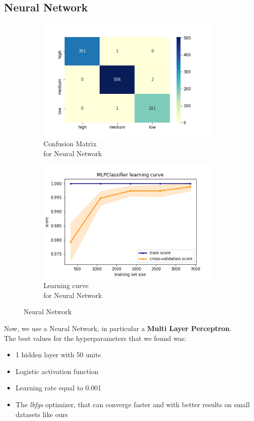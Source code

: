\subsection{Neural Network}
\begin{figure}[h!]
     \captionsetup{justification=centering}             
     \centering
     \begin{subfigure}{0.49\textwidth}
         \centering
         \captionsetup{type=figure}
         \includegraphics[scale=0.45]{img/classification/nn_confusion.png}
         \caption{Confusion Matrix \\ for Neural Network}
         \label{fig:nn_confusion}
     \end{subfigure}
     \begin{subfigure}{0.49\textwidth}
         \centering
         \includegraphics[scale=0.45]{img/classification/nn_lc.png}
         \caption{Learning curve \\ for Neural Network}
         \label{fig:nn_lc}
     \end{subfigure}
     \caption{Neural Network}
    \label{fig:nn}
\end{figure}
Now, we use a Neural Network, in particular a \textbf{Multi Layer Perceptron}.\\
The best values for the hyperparameters that we found was:
\begin{itemize}
\item 1 hidden layer with 50 units
\item Logistic activation function
\item Learning rate equal to 0.001
\item The \emph{lbfgs} optimizer, that can converge faster and with better results on small datasets like ours
\end{itemize}

